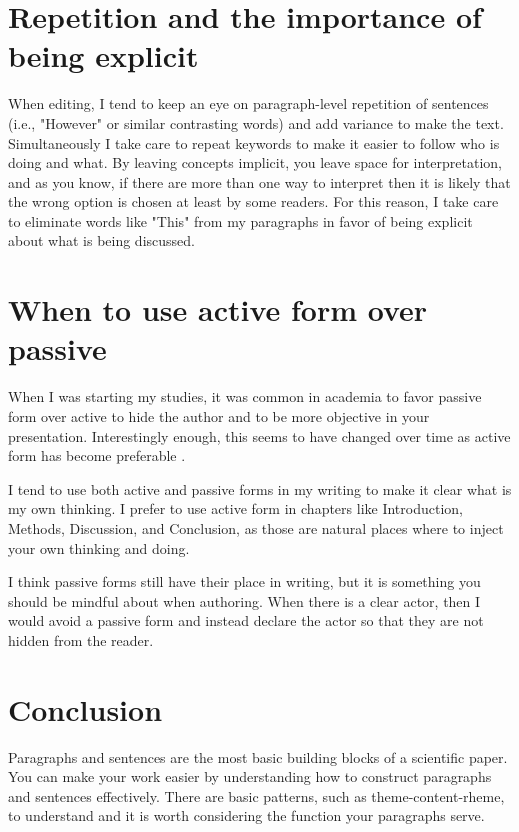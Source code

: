 \section{Repetition and the importance of being explicit}

When editing, I tend to keep an eye on paragraph-level repetition of sentences (i.e., "However" or similar contrasting words) and add variance to make the text.
Simultaneously I take care to repeat keywords to make it easier to follow who is doing and what.
By leaving concepts implicit, you leave space for interpretation, and as you know, if there are more than one way to interpret then it is likely that the wrong option is chosen at least by some readers.
For this reason, I take care to eliminate words like "This" from my paragraphs in favor of being explicit about what is being discussed.

\section{When to use active form over passive}

When I was starting my studies, it was common in academia to favor passive form over active to hide the author and to be more objective in your presentation.
Interestingly enough, this seems to have changed over time as active form has become preferable \citep{ryba2021better}.

I tend to use both active and passive forms in my writing to make it clear what is my own thinking.
I prefer to use active form in chapters like Introduction, Methods, Discussion, and Conclusion, as those are natural places where to inject your own thinking and doing.

I think passive forms still have their place in writing, but it is something you should be mindful about when authoring.
When there is a clear actor, then I would avoid a passive form and instead declare the actor so that they are not hidden from the reader.

\section{Conclusion}

Paragraphs and sentences are the most basic building blocks of a scientific paper. You can make your work easier by understanding how to construct paragraphs and sentences effectively. There are basic patterns, such as theme-content-rheme, to understand and it is worth considering the function your paragraphs serve.
